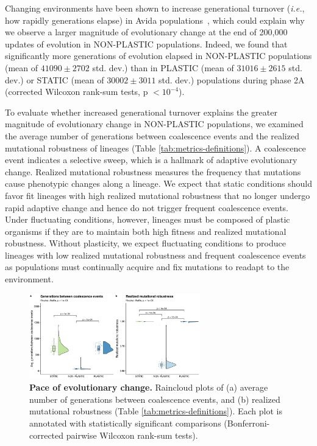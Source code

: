 \begin{raggedbottom}
Changing environments have been shown to increase generational turnover (\textit{i.e.}, how rapidly generations elapse) in Avida populations~\citep{canino-koning_evolution_2016}, which could explain why we observe a larger magnitude of evolutionary change at the end of 200,000 updates of evolution in NON-PLASTIC populations.
Indeed, we found that significantly more generations of evolution elapsed in NON-PLASTIC populations (mean of $41090\pm2702$ std. dev.) than in PLASTIC (mean of $31016\pm2615$ std. dev.) or STATIC (mean of $30002\pm3011$ std. dev.) populations during phase 2A (corrected Wilcoxon rank-sum tests, p $<10^{-4}$).

To evaluate whether increased generational turnover explains the greater magnitude of evolutionary change in NON-PLASTIC populations, we examined the average number of generations between coalescence events and the realized mutational robustness of lineages (Table \ref{tab:metrics-definitions}).
A coalescence event indicates a selective sweep, which is a hallmark of adaptive evolutionary change.
Realized mutational robustness measures the frequency that mutations cause phenotypic changes along a lineage.
We expect that static conditions should favor fit lineages with high realized mutational robustness that no longer undergo rapid adaptive change and hence do not trigger frequent coalescence events.
Under fluctuating conditions, however, lineages must be composed of plastic organisms if they are to maintain both high fitness and realized mutational robustness.
Without plasticity, we expect fluctuating conditions to produce lineages with low realized mutational robustness and frequent coalescence events as populations must continually acquire and fix mutations to readapt to the environment.

\begin{figure}[h!]
  \centering
  \includegraphics[width=0.66\textwidth]{05_consequences_of_plasticity/media/media-evolutionary-change-pace-panel.pdf}
  \caption{\small
  \textbf{Pace of evolutionary change.}
  Raincloud plots of
  (a) average number of generations between coalescence events,
  and (b) realized mutational robustness (Table \ref{tab:metrics-definitions}).
  Each plot is annotated with statistically significant comparisons (Bonferroni-corrected pairwise Wilcoxon rank-sum tests).
  }
  \label{fig:evolutionary-dynamics-rate}
\end{figure}


\end{raggedbottom}
